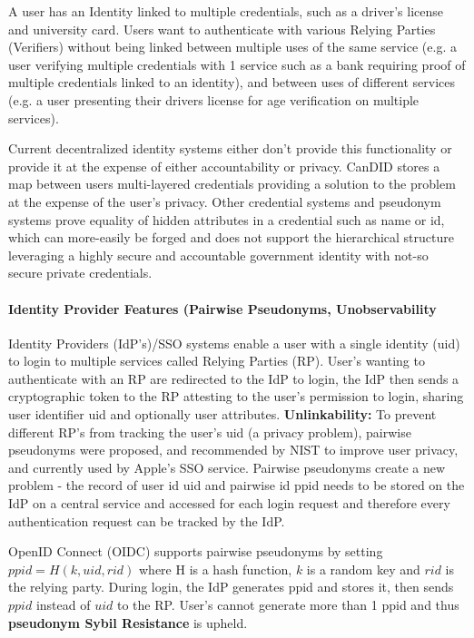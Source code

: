 A user has an Identity linked to multiple credentials, such as a driver's license and university card. Users want to authenticate with various Relying Parties (Verifiers) without being linked between multiple uses of the same service (e.g. a user verifying multiple credentials with 1 service such as a bank requiring proof of multiple credentials linked to an identity), and between uses of different services (e.g. a user presenting their drivers license for age verification on multiple services).

Current decentralized identity systems either don't provide this functionality or provide it at the expense of either accountability or privacy. CanDID stores a map between users multi-layered credentials providing a solution to the problem at the expense of the user's privacy. Other credential systems and pseudonym systems prove equality of hidden attributes in a credential such as name or id, which can more-easily be forged and does not support the hierarchical structure leveraging a highly secure and accountable government identity with not-so secure private credentials.

\paragraph{Identity Provider Features (Pairwise Pseudonyms, Unobservability}
Identity Providers (IdP's)/SSO systems enable a user with a single identity (uid) to login to multiple services called Relying Parties (RP). User's wanting to authenticate with an RP are redirected to the IdP to login, the IdP then sends a cryptographic token to the RP attesting to the user's permission to login, sharing user identifier uid and optionally user attributes.
\textbf{Unlinkability:} To prevent different RP's from tracking the user's uid (a privacy problem), pairwise pseudonyms were proposed, and recommended by NIST to improve user privacy, and currently used by Apple's SSO service. Pairwise pseudonyms create a new problem - the record of user id uid and pairwise id ppid needs to be stored on the IdP on a central service and accessed for each login request and therefore every authentication request can be tracked by the IdP. 

OpenID Connect (OIDC) supports pairwise pseudonyms by setting $ppid = H(k, uid, rid)$ where H is a hash function, $k$ is a random key and $rid$ is the relying party. During login, the IdP generates ppid and stores it, then sends $ppid$ instead of $uid$ to the RP. User's cannot generate more than 1 ppid and thus \textbf{pseudonym Sybil Resistance} is upheld. 

